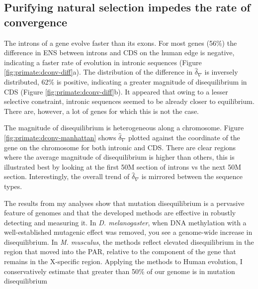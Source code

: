 

\subsection{Purifying natural selection impedes the rate of convergence}

The introns of a gene evolve faster than its exons. For most genes (56\%) the difference in ENS between introns and CDS on the human edge is negative, indicating a faster rate of evolution in intronic sequences (Figure \ref{fig:primate:dconv-diff}a). The distribution of the difference in $\hat\delta_\nabla$ is inversely distributed, 62\% is positive, indicating a greater magnitude of disequilibrium in CDS (Figure \ref{fig:primate:dconv-diff}b). It appeared that owing to a lesser selective constraint, intronic sequences seemed to be already closer to equilibrium. There are, however, a lot of genes for which this is not the case.



The magnitude of disequilibrium is heterogeneous along a chromosome. Figure \ref{fig:primate:dconv-manhattan} shows $\hat \delta_\nabla$ plotted against the coordinate of the gene on the chromosome for both intronic and CDS. There are clear regions where the average magnitude of disequilibrium is higher than others, this is illustrated best by looking at the first 50M section of introns vs the next 50M section. Interestingly, the overall trend of $\hat \delta_\nabla$ is mirrored between the sequence types. 



The results from my analyses show that mutation disequilibrium is a pervasive feature of genomes and that the developed methods are effective in robustly detecting and measuring it. In \textit{D. melanogaster}, when DNA methylation with a well-established mutagenic effect was removed, you see a genome-wide increase in disequilibrium. In \textit{M. musculus}, the methods reflect elevated disequilibrium in the region that moved into the PAR, relative to the component of the gene that remains in the X-specific region. Applying the methods to Human evolution, I conservatively estimate that greater than 50\% of our genome is in mutation disequilibrium